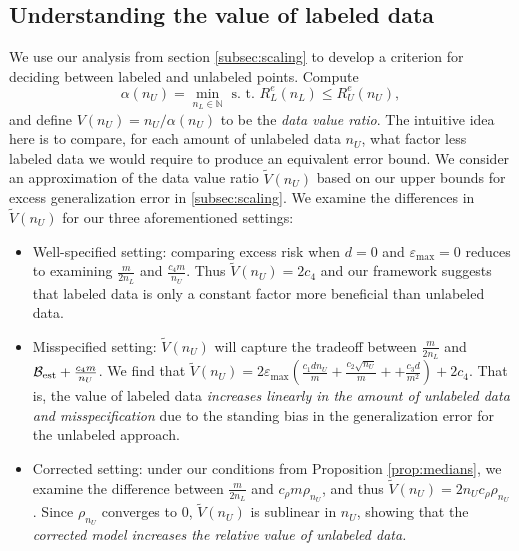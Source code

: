 \subsection{Understanding the value of labeled data}
\vspace{-0.5em}
We use our analysis from section \ref{subsec:scaling} to develop a criterion for deciding between labeled and unlabeled points. Compute
\[\alpha(n_U) = \min_{n_L \in \mathbb{N}} \text{ s. t. } R_L^{e}(n_L) \le R_U^{e}(n_U),\]
and define
$V(n_U) = {n_U}/\alpha(n_U)$
to be the \textit{data value ratio}. The intuitive idea here is to compare, for each amount of unlabeled data $n_U$, what factor less labeled data we would require to produce an equivalent error bound. We consider an approximation of the data value ratio $\widetilde{V}(n_U)$ based on our upper bounds for excess generalization error in \ref{subsec:scaling}. We examine the differences in $\widetilde{V}(n_U)$ for our three aforementioned settings:
\begin{itemize}
    \item Well-specified setting: comparing excess risk when $d = 0$ and $\varepsilon_{\max} = 0$ reduces to examining $\frac{m}{2n_L}$ and $\frac{c_4 m}{n_U}$. Thus $\widetilde{V}(n_U) = 2c_4$ and our framework suggests that labeled data is only a constant factor more beneficial than unlabeled data.
    \item Misspecified setting: $\widetilde{V}(n_U)$ will capture the tradeoff between $\frac{m}{2n_L}$ and $\mathcal{B}_{\mathrm{est}} + \frac{c_4 m }{n_U}$. We find that $\widetilde{V}(n_U) = 2 \varepsilon_{\max} \left(\frac{c_1 dn_U}{m} + \frac{c_2 \sqrt{n_U}}{m} + +\frac{c_3 d}{m^2} \right) + 2 c_4$. That is, the value of labeled data \textit{increases linearly in the amount of unlabeled data and misspecification} due to the standing bias in the generalization error for the unlabeled approach.  
    \item Corrected setting: under our conditions from Proposition \ref{prop:medians}, we examine the difference between $\frac{m}{2n_L}$ and $ c_\rho m \rho_{n_
    U}$, and thus $\widetilde{V}(n_U) = 2n_U c_{\rho} \rho_{n_U}$. Since $\rho_{n_U}$ converges to $0$, $\widetilde{V}(n_U)$ is sublinear in $n_U$, showing that the \textit{corrected model increases the relative value of unlabeled data.}
\end{itemize}

